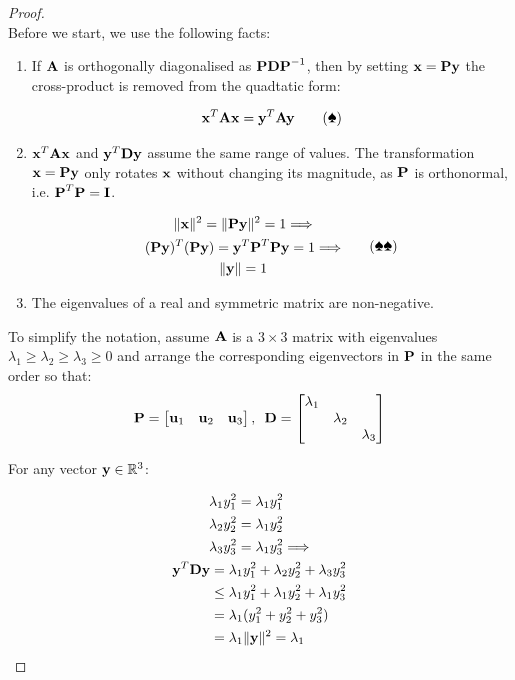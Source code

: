 \documentclass[a4paper]{article}
\numberwithin{equation}{section} %
\newcommand{\setR}{\mathbb{R}} %
\newcommand{\norm}[1] {\lVert #1 \rVert} %
\newcommand{\hquad}{\hskip0.5em\relax}%
\newcommand{\B}[1]{\textbf{\textup{#1}}} %
\begin{document}
\begin{proof}
\quad \\
Before we start, we use the following facts:

\begin{enumerate}
\item If $\B{A}$ is orthogonally diagonalised as $\B{PD}\B{P}^{-1}$, then by setting $\B{x}=\B{Py}$ the cross-product is removed from the quadtatic form:

\[
\B{x}^{T}\B{Ax}=\B{y}^{T}\B{Ay}
\tag{\ding{171}}
\label{eq:opt_proof_quad}
\]

\item $\B{x}^T\B{Ax}$ and $\B{y}^T\B{Dy}$ assume the same range of values. The transformation $\B{x}=\B{Py}$ only rotates $\B{x}$ without changing its magnitude, as $\B{P}$ is orthonormal, i.e. $\B{P}^T\B{P}=\B{I}$.

\[
\begin{gathered}
\norm{\B{x}}^2= \norm{\B{Py}}^2 = 1\Longrightarrow \\
 (\B{Py})^T(\B{Py}) = \B{y}^{T}\B{P}^{T}\B{P}\B{y}=1 \Longrightarrow\\
\norm{\B{y}}=1
\end{gathered}
\tag{\ding{171}\ding{171}}
\label{eq:opt_proof_quad}
\]

\item The eigenvalues of a real and symmetric matrix are non-negative.
\end{enumerate}

To simplify the notation, assume $\B{A}$ is a $3 \times 3$ matrix with eigenvalues $\lambda_1 \geq \lambda_2 \geq \lambda_3 \geq 0$ and arrange the corresponding eigenvectors in $\B{P}$ in the same order so that:
\[
\B{P}=\begin{bmatrix}\B{u}_1 & \B{u}_2 & \B{u}_3 \end{bmatrix}, \hquad
\B{D}=\begin{bmatrix}\lambda_1 & & \\ & \lambda_2 & \\ & & \lambda_3\end{bmatrix}
\]

For any vector $\B{y} \in \setR ^ 3$:

\[
\begin{gathered}
\begin{aligned}
\lambda_1 y_1^2 &= \lambda_1 y_1^2 \\
\lambda_2 y_2^2 &= \lambda_1 y_2^2 \\
\lambda_3 y_3^2 &= \lambda_1 y_3^2 \Longrightarrow \\
\end{aligned}\\
\begin{aligned}
\B{y}^T\B{Dy} &= \lambda_1 y_1^2+ \lambda_2 y_2^2 + \lambda_3 y_3^2 \\
& \leq \lambda_1 y_1^2+ \lambda_1 y_2^2 + \lambda_1 y_3^2 \\
& = \lambda_1 (y_1^2 + y_2^2 + y_3^2) \\
& = \lambda_1 \norm{\B{y}}^2 = \lambda_1
\end{aligned}
\end{gathered}
\]


\end{proof}
\end{document}
